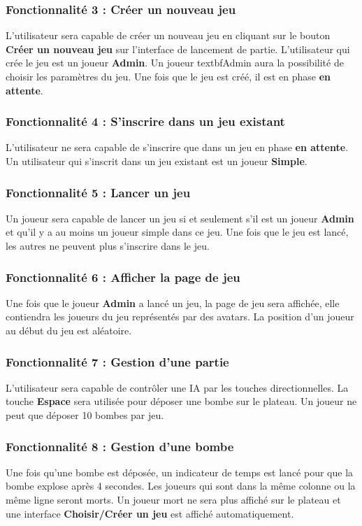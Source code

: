 \subsubsection{Fonctionnalité  3 : Créer un nouveau jeu}
L'utilisateur sera capable de créer un nouveau jeu en cliquant sur le bouton \textbf{Créer un nouveau jeu} sur l'interface de lancement de partie. L'utilisateur qui crée le jeu est un joueur \textbf{Admin}. Un joueur textbf{Admin} aura la possibilité de choisir les paramètres du jeu. Une fois que le jeu est créé, il est en phase \textbf{en attente}.
\subsubsection{Fonctionnalité  4 : S'inscrire dans un jeu existant}
L'utilisateur ne sera capable de s'inscrire que dans un jeu en phase \textbf{en attente}. Un utilisateur qui s'inscrit dans un jeu existant est un joueur \textbf{Simple}.
\subsubsection{Fonctionnalité 5 : Lancer un jeu}
Un joueur sera capable de lancer un jeu si et seulement s'il est un joueur \textbf{Admin} et qu'il y a au moins un joueur simple dans ce jeu. Une fois que le jeu est lancé, les autres ne peuvent plus s'inscrire dans le jeu.

\subsubsection{Fonctionnalité 6 : Afficher la page de jeu}
Une fois que le joueur \textbf{Admin} a lancé un jeu, la page de jeu sera affichée, elle contiendra les joueurs du jeu représentés par des avatars. La position d'un joueur au début du jeu est aléatoire. 

\subsubsection{Fonctionnalité 7 : Gestion d'une partie}
L'utilisateur sera capable de contrôler une IA par les touches directionnelles. La touche \textbf{Espace} sera utilisée pour déposer une bombe sur le plateau. Un joueur ne peut que déposer 10 bombes par jeu.

\subsubsection{Fonctionnalité 8 : Gestion d'une bombe}
Une fois qu'une bombe est déposée, un indicateur de temps est lancé pour que la bombe explose après 4 secondes. Les joueurs qui sont dans la même colonne ou la même ligne seront morts. Un joueur mort ne sera plus affiché sur le plateau et une interface \textbf{Choisir/Créer un jeu} est affiché automatiquement.
